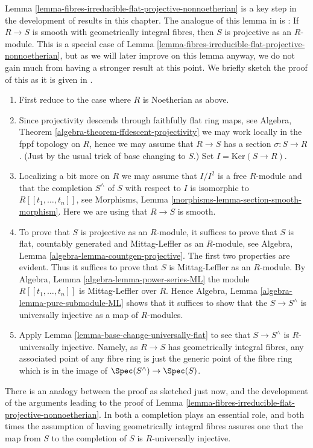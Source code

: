 \begin{remark}
\label{remark-how-in-RG}
Lemma \ref{lemma-fibres-irreducible-flat-projective-nonnoetherian}
is a key step in the development of results in this chapter. The analogue
of this lemma in \cite{GruRay} is \cite[I Proposition 3.3.1]{GruRay}:
If $R \to S$ is smooth with geometrically integral fibres, then $S$
is projective as an $R$-module. This is a special case of
Lemma \ref{lemma-fibres-irreducible-flat-projective-nonnoetherian},
but as we will later improve on this lemma anyway, we do not gain much
from having a stronger result at this point.
We briefly sketch the proof of this as it is given in \cite{GruRay}.
\begin{enumerate}
\item First reduce to the case where $R$ is Noetherian as above.
\item Since projectivity descends through faithfully flat ring maps, see
Algebra, Theorem \ref{algebra-theorem-ffdescent-projectivity}
we may work locally in the fppf topology on $R$, hence we may assume
that $R \to S$ has a section $\sigma : S \to R$. (Just by the usual trick of
base changing to $S$.) Set $I = \text{Ker}(S \to R)$.
\item Localizing a bit more on $R$ we may assume that $I/I^2$ is a free
$R$-module and that the completion $S^\wedge$ of $S$ with respect to $I$
is isomorphic to $R[[t_1, \ldots, t_n]]$, see
Morphisms, Lemma \ref{morphisms-lemma-section-smooth-morphism}.
Here we are using that $R \to S$ is smooth.
\item To prove that $S$ is projective as an $R$-module, it suffices to
prove that $S$ is flat, countably generated and Mittag-Leffler as an
$R$-module, see
Algebra, Lemma \ref{algebra-lemma-countgen-projective}.
The first two properties are evident. Thus it suffices to prove that $S$
is Mittag-Leffler as an $R$-module. By
Algebra, Lemma \ref{algebra-lemma-power-series-ML}
the module $R[[t_1, \ldots, t_n]]$ is Mittag-Leffler over $R$. Hence
Algebra, Lemma \ref{algebra-lemma-pure-submodule-ML}
shows that it suffices to show that the
$S \to S^\wedge$ is universally injective as a map of $R$-modules.
\item Apply
Lemma \ref{lemma-base-change-universally-flat}
to see that $S \to S^\wedge$ is $R$-universally injective.
Namely, as $R \to S$ has geometrically integral fibres, any associated
point of any fibre ring is just the generic point of the fibre ring which
is in the image of $\Spec(S^\wedge) \to \Spec(S)$.
\end{enumerate}
There is an analogy between the proof as sketched just now, and the
development of the arguments leading to the proof of
Lemma \ref{lemma-fibres-irreducible-flat-projective-nonnoetherian}.
In both a completion plays an essential role, and both times the
assumption of having geometrically integral fibres assures one that the
map from $S$ to the completion of $S$ is $R$-universally injective.
\end{remark}













